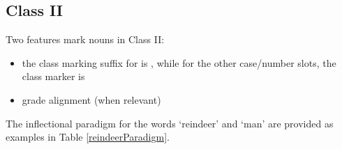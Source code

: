 \FB




\subsection{Class II}\label{NclassII}
Two features mark nouns in Class II: 
\begin{itemize}
\item{the class marking suffix for  is , while for the other case/number slots, the class marker is }
\item{ grade alignment (when relevant)}
\end{itemize}
The inflectional paradigm for the words  ‘reindeer’ and  ‘man’ are provided as examples in Table \vref{reindeerParadigm}.

